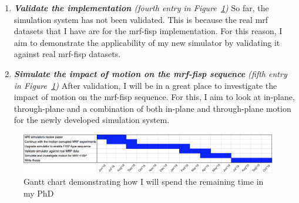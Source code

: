 \begin{enumerate}
	\item \textit{\textbf{Validate the implementation} (fourth entry in Figure~\ref{fig:ganttChart})}
	So far, the simulation system has not been validated.
	This is because the real \ac{mrf} datasets that I have are for the \ac{mrf}-\ac{fisp} implementation.
	For this reason, I aim to demonstrate the applicability of my new simulator by validating it against real \ac{mrf}-\ac{fisp} datasets.
	
	\item \textit{\textbf{Simulate the impact of motion on the \ac{mrf}-\ac{fisp} sequence} (fifth entry in Figure~\ref{fig:ganttChart})}
	After validation, I will be in a great place to investigate the impact of motion on the \ac{mrf}-\ac{fisp} sequence.
	For this, I aim to look at in-plane, through-plane and a combination of both in-plane and through-plane motion for the newly developed simulation system.
	
\end{enumerate}

\begin{figure}[ht]
    \centering
    \includegraphics[width=1\textwidth, keepaspectratio]{images/mri/ganttChart}
    \caption{Gantt chart demonstrating how I will spend the remaining time in my PhD}
    \label{fig:ganttChart}
\end{figure}
